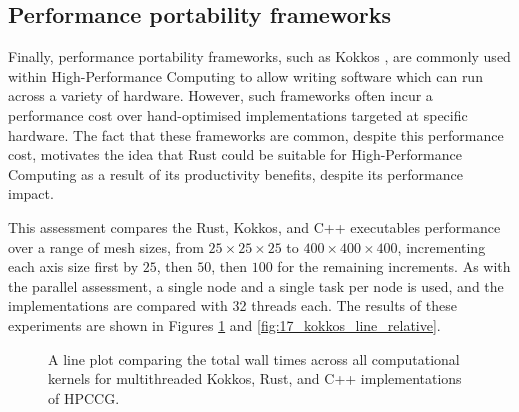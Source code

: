 %     

%     


\subsection{Performance portability frameworks}
\label{ssec:performance-portability-frameworks-results}

Finally, performance portability frameworks, such as Kokkos \cite{KokkosEcosystem}, are commonly used within High-Performance Computing to allow writing software which can run across a variety of hardware. However, such frameworks often incur a performance cost over hand-optimised implementations targeted at specific hardware. The fact that these frameworks are common, despite this performance cost, motivates the idea that Rust could be suitable for High-Performance Computing as a result of its productivity benefits, despite its performance impact.

This assessment compares the Rust, Kokkos, and C++ executables performance over a range of mesh sizes, from $25 \times 25 \times 25$ to $400 \times 400 \times 400$, incrementing each axis size first by $25$, then $50$, then $100$ for the remaining increments. As with the parallel assessment, a single node and a single task per node is used, and the implementations are compared with 32 threads each. The results of these experiments are shown in Figures \ref{fig:16_kokkos_line} and \ref{fig:17_kokkos_line_relative}.

\begin{figure}[H]
    \centering
    
    \caption{A line plot comparing the total wall times across all computational kernels for multithreaded Kokkos, Rust, and C++ implementations of HPCCG.}
    \label{fig:16_kokkos_line}
\end{figure}

